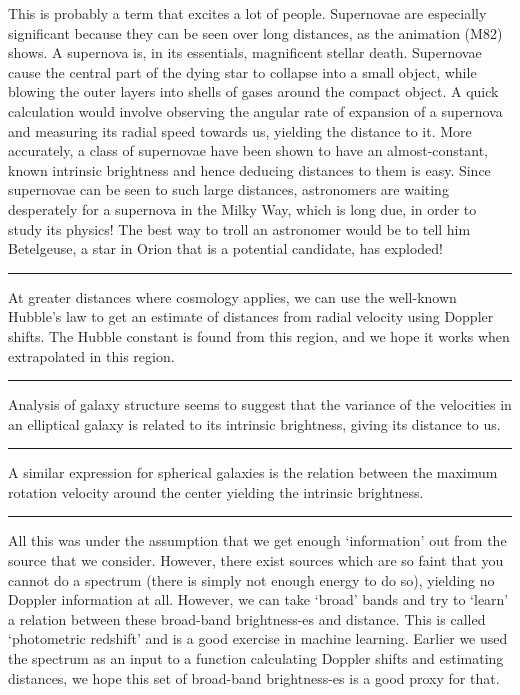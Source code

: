\documentclass[11pt]{article}
\begin{document}
\noindent This is probably a term that excites a lot of people. Supernovae are especially significant because they can be seen over long distances, as the animation (M82) shows. A supernova is, in its essentials, magnificent stellar death. Supernovae cause the central part of the dying star to collapse into a small object, while blowing the outer layers into shells of gases around the compact object. A quick calculation would involve observing the angular rate of expansion of a supernova and measuring its radial speed towards us, yielding the distance to it. More accurately, a class of supernovae have been shown to have an almost-constant, known intrinsic brightness and hence deducing distances to them is easy. Since supernovae can be seen to such large distances, astronomers are waiting desperately for a supernova in the Milky Way, which is long due, in order to study its physics! The best way to troll an astronomer would be to tell him Betelgeuse, a star in Orion that is a potential candidate, has exploded!

\noindent\rule[0.5ex]{\linewidth}{1pt}

\noindent At greater distances where cosmology applies, we can use the well-known Hubble's law to get an estimate of distances from radial velocity using Doppler shifts. The Hubble constant is found from this region, and we hope it works when extrapolated in this region.

\noindent\rule[0.5ex]{\linewidth}{1pt}

\noindent Analysis of galaxy structure seems to suggest that the variance of the velocities in an elliptical galaxy is related to its intrinsic brightness, giving its distance to us.

\noindent\rule[0.5ex]{\linewidth}{1pt}

\noindent A similar expression for spherical galaxies is the relation between the maximum rotation velocity around the center yielding the intrinsic brightness.

\noindent\rule[0.5ex]{\linewidth}{0.5pt}

\noindent All this was under the assumption that we get enough `information' out from the source that we consider. However, there exist sources which are so faint that you cannot do a spectrum (there is simply not enough energy to do so), yielding no Doppler information at all. However, we can take `broad' bands and try to `learn' a relation between these broad-band brightness-es and distance. This is called `photometric redshift' and is a good exercise in machine learning. Earlier we used the spectrum as an input to a function calculating Doppler shifts and estimating distances, we hope this set of broad-band brightness-es is a good proxy for that. 
\end{document}
